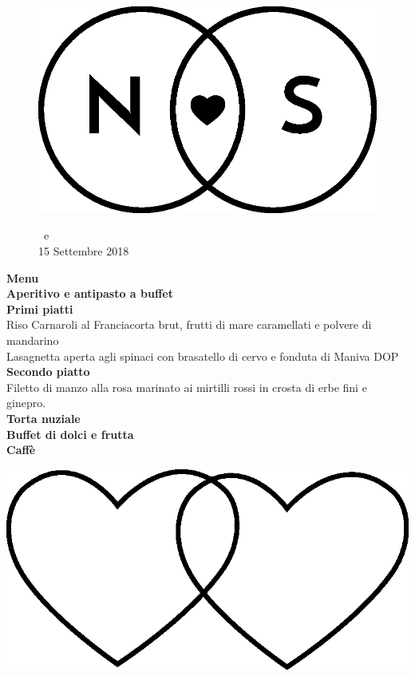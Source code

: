 \documentclass[11pt]{book}
\begin{document}
\begin{center}
\begin{figure}
\centering
\includegraphics[scale=0.3]{img/Logo_piccolo.eps}

\LARGE\NSposo \ e \NSposa\\
\small15 Settembre 2018\\
\end{figure}
\vfill
\Huge \textbf{Menu}\\
\hfill\break
\normalsize\textbf{Aperitivo e antipasto a buffet}\\
\hfill\break
\textbf{Primi piatti}\\
Riso Carnaroli al Franciacorta brut, frutti di mare caramellati e polvere di mandarino\\
\hfill\break
Lasagnetta aperta agli spinaci con brasatello di cervo e fonduta di Maniva DOP\\
\hfill\break
\textbf{Secondo piatto}\\
Filetto di manzo alla rosa marinato ai mirtilli rossi in crosta di erbe fini e ginepro.\\
\hfill\break
\textbf{Torta nuziale}\\
\textbf{Buffet di dolci e frutta}\\
\textbf{Caffè}\\
\vfill
\begin{center}
\includegraphics[scale=0.1]{img/cuori_venn.eps}
\end{center}
\end{center}
\end{document}
